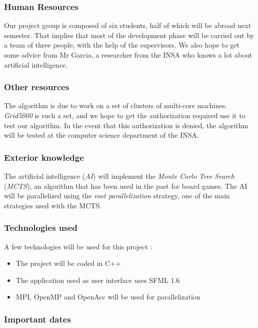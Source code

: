 \subsubsection{Human Resources}

Our project group is composed of six students, half of which will be abroad next semester.
That implies that most of the development phase will be carried out by a team of three people, with the help of the supervisors.
We also hope to get some advice from Mr Garcia, a researcher from the INSA who knows a lot about artificial intelligence.

\subsubsection{Other resources}

The algorithm is due to work on a set of clusters of multi-core machines.
\emph{Grid5000} is such a set, and we hope to get the authorization required use it to test our algorithm.
In the event that this authorization is denied, the algorithm will be tested at the computer science department of the INSA.

\subsubsection{Exterior knowledge}

The artificial intelligence (\emph{AI}) will implement the \emph{Monte Carlo Tree Search} (\emph{MCTS}), an algorithm that has been used in the past for board games.
The AI will be parallelized using the \emph{root parallelization} strategy, one of the main strategies used with the MCTS.

\subsubsection{Technologies used}

A few technologies will be used for this project :
\begin{itemize}
	\item The project will be coded in C++
	\item The application used as user interface uses SFML 1.6
	\item MPI, OpenMP and OpenAcc will be used for parallelization
\end{itemize}

\subsubsection{Important dates}

